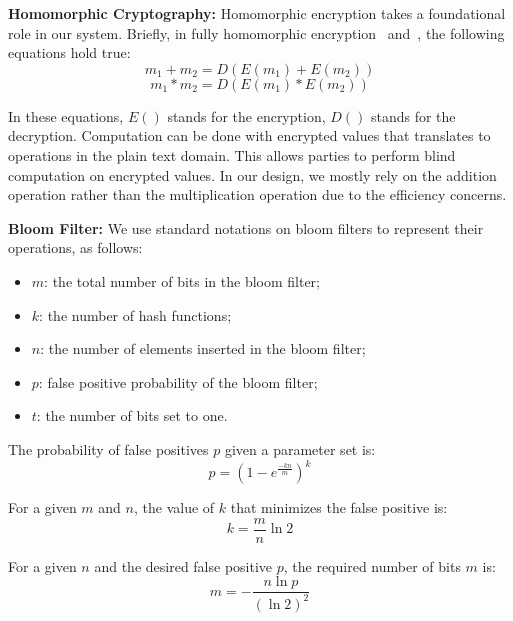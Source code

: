 \textbf{Homomorphic Cryptography:} Homomorphic encryption takes a foundational role in our system. Briefly, in fully homomorphic encryption~\cite{fan2012somewhat} and~\cite{van2010fully}, the following equations hold true:
\vspace{-0.1in}
\begin{equation}
m_1 + m_2 = D(E(m_1) + E(m_2))
\end{equation}
\begin{equation}
m_1 * m_2 = D(E(m_1) * E(m_2))
\end{equation}

In these equations, $E()$ stands for the encryption, $D()$ stands for the decryption. Computation can be done with encrypted values that translates to operations in the plain text domain. This allows parties to perform blind computation on encrypted values. In our design, we mostly rely on the addition operation rather than the multiplication operation due to the efficiency concerns.

\textbf{Bloom Filter:} We use standard notations on bloom filters to represent their operations, as follows:

\begin{itemize}
\item $m$: the total number of bits in the bloom filter;
\item $k$: the number of hash functions;
\item $n$: the number of elements inserted in the bloom filter;
\item $p$: false positive probability of the bloom filter;
\item $t$: the number of bits set to one.
\end{itemize}

The probability of false positives $p$ given a parameter set is:
\vspace{-0.1in}
\begin{equation}
p = (1-e^{\frac{-kn}{m}})^k
\label{equ:p}
\end{equation}

For a given $m$ and $n$, the value of $k$ that minimizes the false positive is:
\vspace{-0.1in}
\begin{equation}
k = \frac{m}{n}\ln2
\label{equ:k}
\end{equation}

For a given $n$ and the desired false positive $p$, the required number of bits $m$ is:
\vspace{-0.1in}
\begin{equation}
m = - \frac{n\ln p}{{(\ln2)}^2}
\label{equ:m}
\end{equation}


